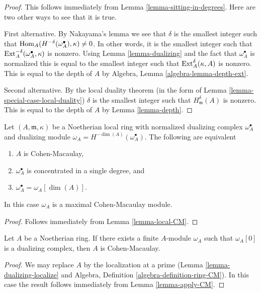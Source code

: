 \begin{proof}
This follows immediately from
Lemma \ref{lemma-sitting-in-degrees}.
Here are two other ways to see that it is true.

\medskip\noindent
First alternative. By Nakayama's lemma we see that
$\delta$ is the smallest integer such that
$\mathop{\mathrm{Hom}}\nolimits_A(H^{-\delta}(\omega_A^\bullet), \kappa) \not = 0$.
In other words, it is the smallest integer such that
$\mathop{\mathrm{Ext}}\nolimits_A^{-\delta}(\omega_A^\bullet, \kappa)$
is nonzero. Using Lemma \ref{lemma-dualizing} and the fact that
$\omega_A^\bullet$ is normalized this is equal to the
smallest integer such that $\mathop{\mathrm{Ext}}\nolimits_A^\delta(\kappa, A)$ is
nonzero. This is equal to the depth of $A$ by
Algebra, Lemma \ref{algebra-lemma-depth-ext}.

\medskip\noindent
Second alternative. By the local duality theorem
(in the form of Lemma \ref{lemma-special-case-local-duality})
$\delta$ is the smallest integer such that $H^\delta_\mathfrak m(A)$
is nonzero. This is equal to the depth of $A$ by
Lemma \ref{lemma-depth}.
\end{proof}

\begin{lemma}
\label{lemma-apply-CM}
Let $(A, \mathfrak m, \kappa)$ be a Noetherian local ring
with normalized dualizing complex $\omega_A^\bullet$
and dualizing module $\omega_A = H^{-\dim(A)}(\omega_A^\bullet)$.
The following are equivalent
\begin{enumerate}
\item $A$ is Cohen-Macaulay,
\item $\omega_A^\bullet$ is concentrated in a single degree, and
\item $\omega_A^\bullet = \omega_A[\dim(A)]$.
\end{enumerate}
In this case $\omega_A$ is a maximal Cohen-Macaulay module.
\end{lemma}

\begin{proof}
Follows immediately from Lemma \ref{lemma-local-CM}.
\end{proof}

\begin{lemma}
\label{lemma-has-dualizing-module-CM}
Let $A$ be a Noetherian ring. If there exists a finite $A$-module
$\omega_A$ such that $\omega_A[0]$ is a dualizing complex, then
$A$ is Cohen-Macaulay.
\end{lemma}

\begin{proof}
We may replace $A$ by the localization at a prime
(Lemma \ref{lemma-dualizing-localize} and
Algebra, Definition \ref{algebra-definition-ring-CM}).
In this case the result follows immediately from
Lemma \ref{lemma-apply-CM}.
\end{proof}

